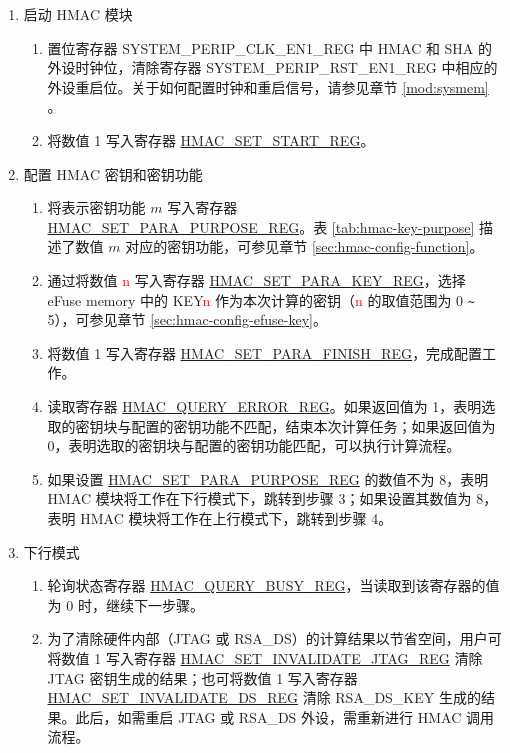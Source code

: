 \documentclass[main\_\_CN.tex]{subfiles}
\begin{document}
\begin{enumerate}
    \item 启动 HMAC 模块
    \begin{enumerate}
        \item 置位寄存器 SYSTEM\_PERIP\_CLK\_EN1\_REG 中 HMAC 和 SHA 的外设时钟位，清除寄存器 SYSTEM\_PERIP\_RST\_EN1\_REG 中相应的外设重启位。关于如何配置时钟和重启信号，请参见章节 \ref{mod:sysmem} \textit{}。
        \item 将数值 1 写入寄存器 \hyperref[regdesc:HMACSETSTARTREG]{HMAC\_SET\_START\_REG}。
    \end{enumerate}

    \item 配置 HMAC 密钥和密钥功能
        \begin{enumerate}
            \item 将表示密钥功能 \begin{math}m\end{math} 写入寄存器 \hyperref[regdesc:HMACSETPARAPURPOSEREG]{HMAC\_SET\_PARA\_PURPOSE\_REG}。表 \ref{tab:hmac-key-purpose} 描述了数值 \begin{math}m\end{math} 对应的密钥功能，可参见章节 \ref{sec:hmac-config-function}。
            \item 通过将数值 \textcolor{red}{n} 写入寄存器 \hyperref[regdesc:HMACSETPARAKEYREG]{HMAC\_SET\_PARA\_KEY\_REG}，选择 eFuse memory 中的 KEY\textcolor{red}{n} 作为本次计算的密钥（\textcolor{red}{n} 的取值范围为 0 \verb+~+ 5），可参见章节 \ref{sec:hmac-config-efuse-key}。
            \item 将数值 1 写入寄存器 \hyperref[regdesc:HMACSETPARAFINISHREG]{HMAC\_SET\_PARA\_FINISH\_REG}，完成配置工作。
            \item 读取寄存器 \hyperref[regdesc:HMACQUERYERRORREG]{HMAC\_QUERY\_ERROR\_REG}。如果返回值为 1，表明选取的密钥块与配置的密钥功能不匹配，结束本次计算任务；如果返回值为 0，表明选取的密钥块与配置的密钥功能匹配，可以执行计算流程。
            \item 如果设置 \hyperref[regdesc:HMACSETPARAPURPOSEREG]{HMAC\_SET\_PARA\_PURPOSE\_REG} 的数值不为 8，表明 HMAC 模块将工作在下行模式下，跳转到步骤 3；如果设置其数值为 8，表明 HMAC 模块将工作在上行模式下，跳转到步骤 4。
        \end{enumerate}

    \item 下行模式
        \begin{enumerate}
            \item 轮询状态寄存器 \hyperref[regdesc:HMACQUERYBUSYREG]{HMAC\_QUERY\_BUSY\_REG}，当读取到该寄存器的值为 0 时，继续下一步骤。
            \item 为了清除硬件内部（JTAG 或 RSA\_DS）的计算结果以节省空间，用户可将数值 1 写入寄存器 \hyperref[regdesc:HMACSETINVALIDATEJTAGREG]{HMAC\_SET\_INVALIDATE\_JTAG\_REG} 清除 JTAG 密钥生成的结果；也可将数值 1 写入寄存器 \hyperref[regdesc:HMACSETINVALIDATEDSREG]{HMAC\_SET\_INVALIDATE\_DS\_REG} 清除 RSA\_DS\_KEY 生成的结果。此后，如需重启 JTAG 或 RSA\_DS 外设，需重新进行 HMAC 调用流程。
        \end{enumerate}


\end{enumerate}
\end{document}

